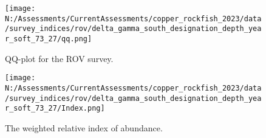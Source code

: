 \documentclass[11pt,
  english,
  letterpaper,
]{article}
\begin{document}
\begin{figure}
\centering
\texttt{[image: N:/Assessments/CurrentAssessments/copper\_rockfish\_2023/data/survey\_indices/rov/delta\_gamma\_south\_designation\_depth\_year\_soft\_73\_27/qq.png]}
\caption{QQ-plot for the ROV survey.\label{fig:rov-qq}}
\end{figure}

\newpage

\begin{figure}
\centering
\texttt{[image: N:/Assessments/CurrentAssessments/copper\_rockfish\_2023/data/survey\_indices/rov/delta\_gamma\_south\_designation\_depth\_year\_soft\_73\_27/Index.png]}
\caption{The weighted relative index of abundance.\label{fig:rov-index}}
\end{figure}

\newpage
\end{document}
